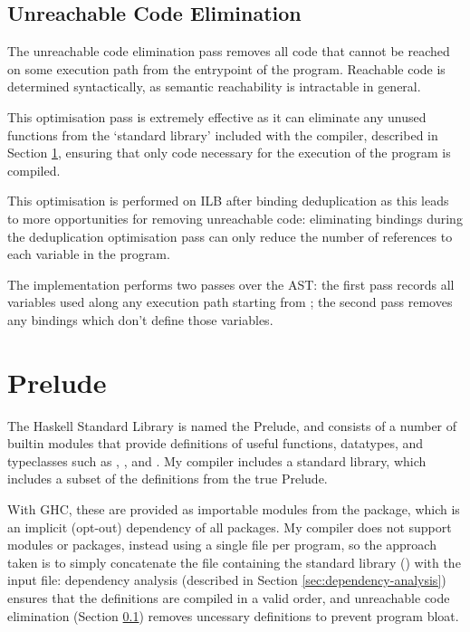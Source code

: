 \documentclass[dissertation.tex]{subfiles}
\begin{document}
{    \subsection{Unreachable Code Elimination}\label{sec:unreachable-elim}
    {
        The unreachable code elimination pass removes all code that cannot be reached on some execution path from the entrypoint of the program. Reachable code is determined syntactically, as semantic reachability is intractable in general.

        This optimisation pass is extremely effective as it can eliminate any unused functions from the `standard library' included with the compiler, described in Section \ref{sec:prelude}, ensuring that only code necessary for the execution of the program is compiled.

        This optimisation is performed on ILB after binding deduplication as this leads to more opportunities for removing unreachable code: eliminating bindings during the deduplication optimisation pass can only reduce the number of references to each variable in the program.

        The implementation performs two passes over the AST: the first pass records all variables used along any execution path starting from ; the second pass removes any bindings which don't define those variables.
    }
}
\section{Prelude}\label{sec:prelude}
{
    The Haskell Standard Library is named the Prelude, and consists of a number of builtin modules that provide definitions of useful functions, datatypes, and typeclasses such as , , and . My compiler includes a standard library, which includes a subset of the definitions from the true Prelude.
    
    With GHC, these are provided as importable modules from the  package, which is an implicit (opt-out) dependency of all packages. My compiler does not support modules or packages, instead using a single file per program, so the approach taken is to simply concatenate the file containing the standard library () with the input file: dependency analysis (described in Section \ref{sec:dependency-analysis}) ensures that the definitions are compiled in a valid order, and unreachable code elimination (Section \ref{sec:unreachable-elim}) removes uncessary definitions to prevent program bloat.
}
\end{document}
